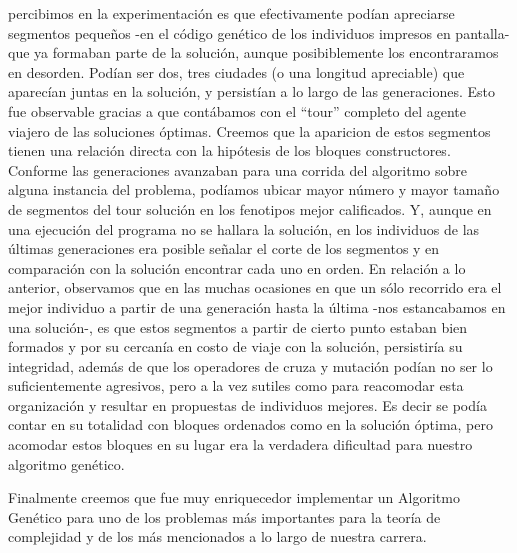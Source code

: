 \documentclass[12pt]{article}
\begin{document}
percibimos en la experimentación es que efectivamente podían apreciarse
segmentos pequeños -en el código genético de los individuos impresos en pantalla-
que ya formaban parte de la solución, aunque posibiblemente los encontraramos
en desorden. Podían ser dos, tres ciudades (o una longitud apreciable) que
aparecían juntas en la solución,
y persistían a lo largo de las generaciones. Esto fue observable gracias a que contábamos
con el ``tour'' completo del agente viajero de las soluciones óptimas. Creemos
que la aparicion de estos segmentos tienen una relación directa con la hipótesis
de los bloques constructores. Conforme las generaciones avanzaban para una
corrida del algoritmo sobre alguna instancia del problema, podíamos ubicar
mayor número y mayor tamaño de segmentos del tour solución en los fenotipos
mejor calificados. Y, aunque en una ejecución del programa no se hallara la solución,
en los individuos de las últimas generaciones era posible señalar el corte de
los segmentos y en comparación con la solución encontrar cada uno en orden.
En relación a lo anterior, observamos que en las muchas ocasiones en que
un sólo recorrido era el mejor individuo a partir de una generación hasta la última
-nos estancabamos en una solución-,
es que estos segmentos a partir de cierto punto estaban bien formados y por su cercanía
en costo de viaje con la solución, persistiría su integridad, además de que
los operadores de cruza y mutación podían no ser lo suficientemente agresivos,
pero a la vez sutiles como
para reacomodar esta organización y resultar en propuestas de individuos mejores.
Es decir se podía contar en su totalidad con bloques ordenados como en la solución
óptima, pero acomodar estos bloques en su lugar era la verdadera dificultad para nuestro
algoritmo genético.\par

Finalmente creemos que fue muy enriquecedor implementar un Algoritmo Genético para
uno de los problemas más importantes para la teoría de complejidad y de los más
mencionados a lo largo de nuestra carrera.
\end{document}
